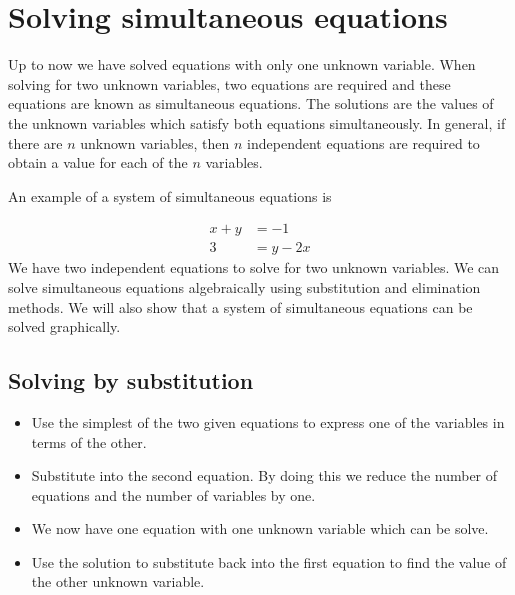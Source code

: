 \section{Solving simultaneous equations}

Up to now we have solved equations with only one unknown variable. 
When solving for two unknown variables, two equations are required and these equations are known as simultaneous equations. 
The solutions are the values of the unknown variables which satisfy both equations simultaneously. In general, if there are $n$ unknown variables, then $n$ independent equations are required to obtain a value for each of the $n$ variables.\par 
An example of a system of simultaneous equations is

\begin{align*}
  x+y &= -1 \\ 
  3 &= y-2x
\end{align*}
We have two independent equations to solve for two unknown variables. We can solve simultaneous equations algebraically using substitution and elimination methods. We will also show that a system of simultaneous equations can be solved graphically.\par 

\subsection*{Solving by substitution}
\begin{itemize}
 \item Use the simplest of the two given equations to express one of the variables in terms of the other.
\item Substitute into the second equation. By doing this we reduce the number of equations and the number of variables by one.
\item We now have one equation with one unknown variable which can be solve.
\item Use the solution to substitute back into the first equation to find the value of the other unknown variable.
\end{itemize}

